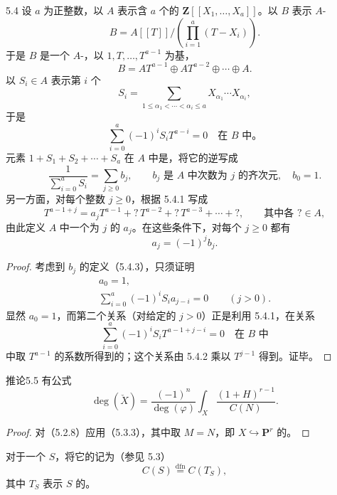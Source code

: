 \begin{SGAresult}{}{5.4}
设 $a$ 为正整数，以 $A$ 表示含 $a$ 个的 $\mathbf Z[[X_1,\ldots,X_a]]$。以 $B$ 表示 $A$-
\[
B=A[[T]]\Big/\left(\prod_{i=1}^{a}(T-X_i)\right).
\]
于是 $B$ 是一个 $A$-，以 $1,T,\ldots,T^{a-1}$ 为基，
\[
B=AT^{a-1}\oplus AT^{a-2}\oplus\cdots\oplus A.
\tag{5.4.1}
\]
以 $S_i\in A$ 表示第 $i$ 个
\[
S_i=\sum_{1\leq\alpha_1<\cdots<\alpha_i\leq a}
X_{\alpha_1}\cdots X_{\alpha_i},
\]
于是
\[
\sum_{i=0}^{a}(-1)^iS_iT^{a-i}=0\quad\text{在 }B\text{ 中}。
\tag{5.4.2}
\]
元素 $1+S_1+S_2+\cdots+S_a$ 在 $A$ 中是，将它的逆写成
\[
\frac1{\sum_{i=0}^{a}S_i}=\sum_{j\geq0}b_j,
\qquad b_j\text{ 是 }A\text{ 中次数为 }j\text{ 的齐次元},\quad b_0=1.
\tag{5.4.3}
\]
另一方面，对每个整数 $j\geq0$，根据 5.4.1 写成
\[
T^{a-1+j}=a_jT^{a-1}+\mathord?\,T^{a-2}
+\mathord?\,T^{a-3}+\cdots+\mathord?,
\qquad\text{其中各 }?\in A,
\tag{5.4.4}
\]
由此定义 $A$ 中一个为 $j$ 的 $a_j$。在这些条件下，对每个 $j\geq0$ 都有
\[
a_j=(-1)^jb_j.
\tag{5.4.5}
\]
\end{SGAresult}
\begin{proof}
考虑到 $b_j$ 的定义（5.4.3），只须证明
\[
\begin{gathered}
a_0=1,\\
\sum_{i=0}^{a}(-1)^iS_i a_{j-i}=0\qquad(j>0).
\end{gathered}
\tag{5.4.6}
\]
显然 $a_0=1$，而第二个关系（对给定的 $j>0$）正是利用 5.4.1，在关系
\[
\sum_{i=0}^{a}(-1)^iS_iT^{a-1+j-i}=0\quad\text{在 }B\text{ 中}
\tag{5.4.7}
\]
中取 $T^{a-1}$ 的系数所得到的；这个关系由 5.4.2 乘以 $T^{j-1}$ 得到。证毕。
\end{proof}

\begin{SGAresult}{推论}{5.5}
有公式
\[
\deg(\check X)=\frac{(-1)^n}{\deg(\varphi)}
\int_X\frac{(1+H)^{r-1}}{C(N)}.
\tag{5.5.1}
\]
\end{SGAresult}
\begin{proof}
对（5.2.8）应用（5.3.3），其中取 $M=N$，即 $X\hookrightarrow\mathbf P^r$ 的。
\end{proof}
对于一个 $S$，将它的记为（参见 5.3）
\[
C(S)\overset{\mathrm{dfn}}=C(T_S),
\tag{5.5.2}
\]
其中 $T_S$ 表示 $S$ 的。

